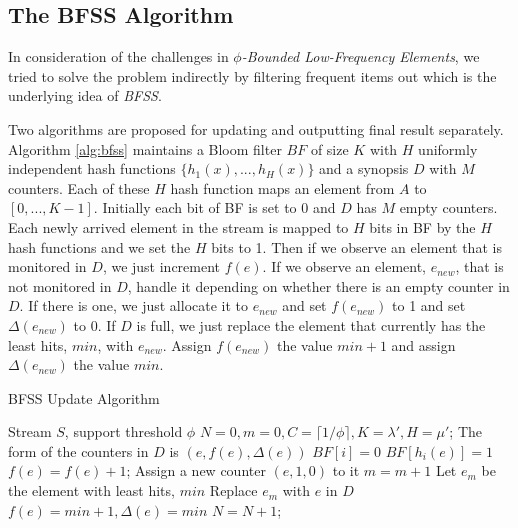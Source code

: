 \documentclass[conference]{IEEEtran}
\begin{document}
\subsection{The BFSS Algorithm}\label{sec:bfss}
In consideration of the challenges in $\phi$\emph{-Bounded Low-Frequency Elements}, we tried to solve the problem indirectly by filtering frequent items out which is the underlying idea of \emph{BFSS}.\par
Two algorithms are proposed for updating and outputting final result separately. Algorithm \ref{alg:bfss} maintains a Bloom filter $BF$ of size $K$ with $H$ uniformly independent hash functions $\{h_1(x),...,h_H(x)\}$ and a synopsis $D$ with $M$ counters. Each of these $H$ hash function maps an element from $A$ to $[0,...,K-1]$. Initially each bit of BF is set to 0 and $D$ has $M$ empty counters. Each newly arrived element in the stream is mapped to $H$ bits in BF by the $H$ hash functions and we set the $H$ bits to 1. Then if we observe an element that is monitored in $D$, we just increment $f(e)$. If we observe an element, $e_{new}$, that is not monitored in $D$, handle it depending on whether there is an empty counter in $D$. If there is one, we just allocate it to $e_{new}$ and set $f(e_{new})$ to 1 and set $\Delta(e_{new})$ to 0. If $D$ is full, we just replace the element that currently has the least hits, $min$, with $e_{new}$. Assign $f(e_{new})$ the value $min+1$ and assign $\Delta(e_{new})$ the value $min$.\par



\begin{algorithm}[h]
	\caption{BFSS Update Algorithm}
	\label{alg:bfss}
\begin{algorithmic}[1]
	\REQUIRE Stream $S$, support threshold $\phi$
	\STATE $N=0,m=0,C=\lceil 1/\phi\rceil,K=\lambda',H=\mu'$; 
	\STATE The form of the counters in $D$ is $(e,f(e),\Delta(e))$
	\STATE $BF[i]=0$
	\ENDFOR
	\STATE $BF[h_i(e)]=1$
	\ENDFOR
	\STATE $f(e)=f(e)+1$;
	\STATE Assign a new counter $(e,1,0)$ to it
	\STATE $m=m+1$
	\ELSE
	\STATE Let $e_m$ be the element with least hits, $min$
	\STATE Replace $e_m$ with $e$ in $D$
	\STATE $f(e)=min+1,\Delta(e)=min$
	\ENDIF
	\STATE $N=N+1$;
	\ENDFOR
\end{algorithmic}
\end{algorithm}
\end{document}
